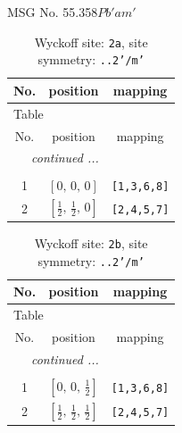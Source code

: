 \documentclass[fleqn,8pt]{jsarticle}
\begin{document}
\setcounter{MaxMatrixCols}{32}

\renewcommand{\tablename}{Table~}
\renewcommand{\figurename}{Figure~}
\begin{center}
\LARGE
MSG No. 55.358\quad$Pb'am'$
\end{center}
\renewcommand{\arraystretch}{1.2}
\begin{longtable}{ccc}
\caption{Wyckoff site: {\tt 2a}, site symmetry: {\tt ..2'/m'}}
 \\
 \hline \hline
No. & position & mapping \\ \hline \endfirsthead

\multicolumn{2}{l}{\tablename\ \thetable{}} \\
 \hline \hline
No. & position & mapping \\ \hline \endhead

 \hline \hline
\multicolumn{2}{r}{\footnotesize\it continued ...} \\ \endfoot

 \hline \hline
\multicolumn{2}{r}{} \\ \endlastfoot

1 & $\left[ 0,\, 0,\, 0 \right]$ & {\tt [1,3,6,8]} \\ \hline
2 & $\left[ \frac{1}{2},\, \frac{1}{2},\, 0 \right]$ & {\tt [2,4,5,7]} \\
\end{longtable}
\renewcommand{\arraystretch}{1.2}
\begin{longtable}{ccc}
\caption{Wyckoff site: {\tt 2b}, site symmetry: {\tt ..2'/m'}}
 \\
 \hline \hline
No. & position & mapping \\ \hline \endfirsthead

\multicolumn{2}{l}{\tablename\ \thetable{}} \\
 \hline \hline
No. & position & mapping \\ \hline \endhead

 \hline \hline
\multicolumn{2}{r}{\footnotesize\it continued ...} \\ \endfoot

 \hline \hline
\multicolumn{2}{r}{} \\ \endlastfoot

1 & $\left[ 0,\, 0,\, \frac{1}{2} \right]$ & {\tt [1,3,6,8]} \\ \hline
2 & $\left[ \frac{1}{2},\, \frac{1}{2},\, \frac{1}{2} \right]$ & {\tt [2,4,5,7]} \\
\end{longtable}
\end{document}
